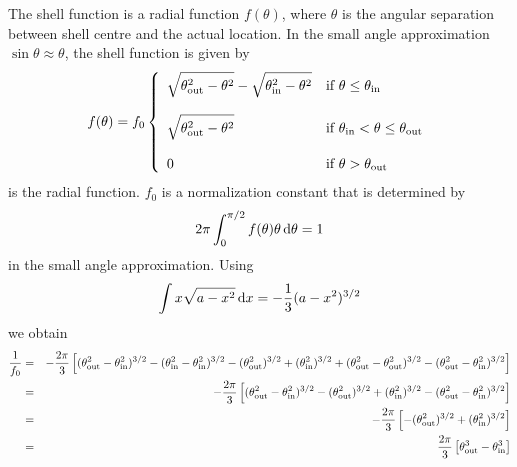 \documentclass{article}[12pt,a4]
\begin{document}
The shell function is a radial function $f(\theta)$, where $\theta$ is the angular separation
between shell centre and the actual location.
In the small angle approximation $\sin \theta \approx \theta$, the shell function is given
by
\begin{equation}
f(\theta) = f_0 \left \{
   \begin{array}{l l}
      \displaystyle
      \sqrt{ \theta_{\rm out}^2 - \theta^2 } - \sqrt{ \theta_{\rm in}^2 - \theta^2 }
      & \mbox{if $\theta \le \theta_{\rm in}$} \\
      \\
     \displaystyle
      \sqrt{ \theta_{\rm out}^2 - \theta^2 }
      & \mbox{if $\theta_{\rm in} < \theta \le \theta_{\rm out}$} \\
      \\
     \displaystyle
     0 & \mbox{if $\theta > \theta_{\rm out}$}
   \end{array}
   \right .
\end{equation}
is the radial function.
$f_0$ is a normalization constant that is determined by
\begin{equation}
2 \pi \int_0^{\pi/2} f(\theta) \theta \, {\rm d}\theta = 1
\end{equation}
in the small angle approximation.
Using
\begin{equation}
\int x \sqrt {a-x^2} \, {\rm d}x = -\frac{1}{3} (a-x^2)^{3/2}
\end{equation}
we obtain
\begin{eqnarray}
\frac{1}{f_0} & = &
  -\frac{2 \pi}{3} \left[ (\theta_{\rm out}^2 - \theta_{\rm in}^2)^{3/2} -
                               (\theta_{\rm in}^2 - \theta_{\rm in}^2)^{3/2} -
                               (\theta_{\rm out}^2)^{3/2} +
                               (\theta_{\rm in}^2)^{3/2} +
                               (\theta_{\rm out}^2 - \theta_{\rm out}^2)^{3/2} -
                               (\theta_{\rm out}^2 - \theta_{\rm in}^2)^{3/2} \right] \\
& = & -\frac{2 \pi}{3} \left[ (\theta_{\rm out}^2 - \theta_{\rm in}^2)^{3/2} -
                                        (\theta_{\rm out}^2)^{3/2} +
                                        (\theta_{\rm in}^2)^{3/2} -
                                        (\theta_{\rm out}^2 - \theta_{\rm in}^2)^{3/2} \right] \\
& = & -\frac{2 \pi}{3} \left[ -(\theta_{\rm out}^2)^{3/2} + (\theta_{\rm in}^2)^{3/2} \right] \\
& = & \frac{2 \pi}{3} \left[ \theta_{\rm out}^3 - \theta_{\rm in}^3 \right]
\end{eqnarray}
\end{document}
